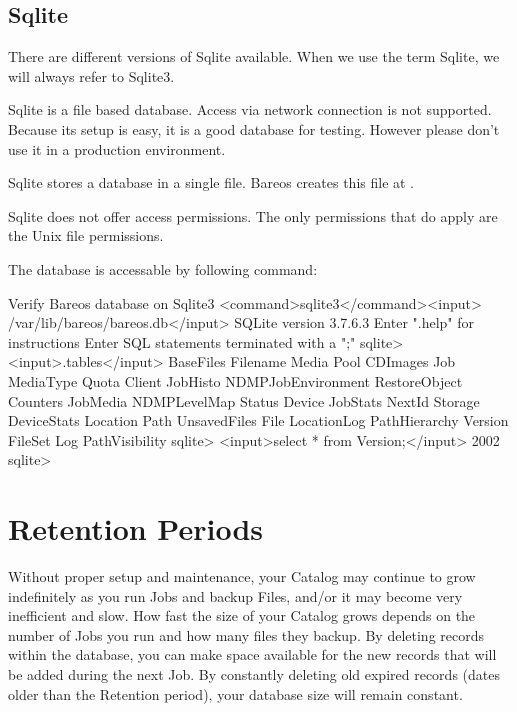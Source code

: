 \subsection{Sqlite}

There are different versions of Sqlite available. When we use the term Sqlite, we will always refer to Sqlite3.

Sqlite is a file based database. Access via network connection is not supported.
Because its setup is easy, it is a good database for testing.
However please don't use it in a production environment.

Sqlite stores a database in a single file.
Bareos creates this file at .

Sqlite does not offer access permissions. The only permissions that do apply are the Unix file permissions.

The database is accessable by following command:
\begin{commands}{Verify Bareos database on Sqlite3}
<command>sqlite3</command><input> /var/lib/bareos/bareos.db</input>
SQLite version 3.7.6.3
Enter ".help" for instructions
Enter SQL statements terminated with a ";"
sqlite> <input>.tables</input>
BaseFiles           Filename            Media               Pool
CDImages            Job                 MediaType           Quota
Client              JobHisto            NDMPJobEnvironment  RestoreObject
Counters            JobMedia            NDMPLevelMap        Status
Device              JobStats            NextId              Storage
DeviceStats         Location            Path                UnsavedFiles
File                LocationLog         PathHierarchy       Version
FileSet             Log                 PathVisibility
sqlite> <input>select * from Version;</input>
2002
sqlite>
\end{commands}




\section{Retention Periods}

Without proper setup and maintenance, your Catalog may continue to grow
indefinitely as you run Jobs and backup Files, and/or it may become
very inefficient and slow. How fast the size of your
Catalog grows depends on the number of Jobs you run and how many files they
backup. By deleting records within the database, you can make space available
for the new records that will be added during the next Job. By constantly
deleting old expired records (dates older than the Retention period), your
database size will remain constant.


